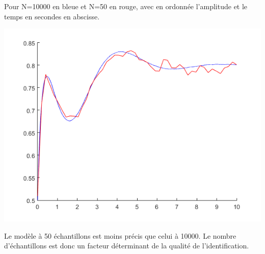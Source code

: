 \documentclass[12pt]{article}
\begin{document}
Pour N=10000 en bleue et N=50 en rouge, avec en ordonnée l'amplitude et le temps en secondes en abscisse.
\begin{flushleft}
\includegraphics{2_4_b.PNG}
\end{flushleft}
Le modèle à 50 échantillons est moins précis que celui à 10000. Le nombre d'échantillons est donc un facteur déterminant de la qualité de l'identification.
\medbreak
\end{document}
